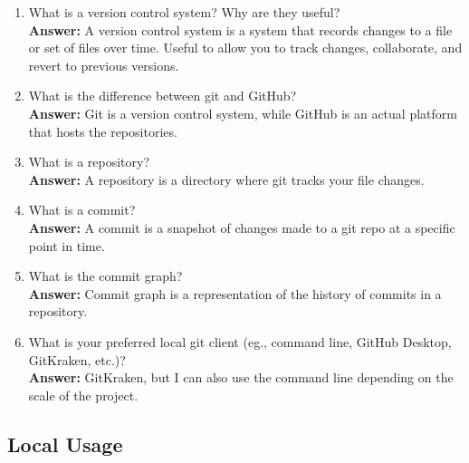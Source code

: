 \documentclass[10pt,twocolumn]{article}
\begin{document}
\begin{enumerate}
    \item What is a version control system? Why are they useful?\\
    \textbf{Answer:}
    A version control system is a system that records changes to a file or set of files over time. Useful to allow you to track changes, collaborate, and revert to previous versions.

    \item What is the difference between git and GitHub?\\
    \textbf{Answer:}
    Git is a version control system, while GitHub is an actual platform that hosts the repositories.

    \item What is a repository?\\
    \textbf{Answer:}
    A repository is a directory where git tracks your file changes.

    \item What is a commit?\\
    \textbf{Answer:}
    A commit is a snapshot of changes made to a git repo at a specific point in time.

    \item What is the commit graph?\\
    \textbf{Answer:}
    Commit graph is a representation of the history of commits in a repository.

    \item What is your preferred local git client (eg., command line, GitHub Desktop, GitKraken, etc.)?\\
    \textbf{Answer:}
    GitKraken, but I can also use the command line depending on the scale of the project.

\end{enumerate}

\subsection{Local Usage}
\end{document}
